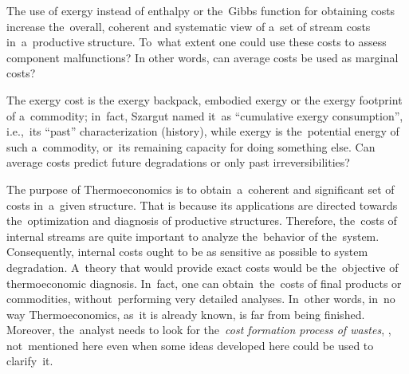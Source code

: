 \documentclass[energies,article,accept,moreauthors,pdftex]{Definitions/mdpi}
\begin{document}
The use of exergy instead of enthalpy or the~Gibbs function for obtaining costs increase the~overall, coherent and systematic view of a~set of stream costs in~a~productive structure. To~what extent one could use these costs to assess component malfunctions? In other words, can average costs be used as marginal costs?

The exergy cost is the exergy backpack, embodied exergy or the exergy footprint of a~commodity; in~fact, Szargut named it~as “cumulative exergy consumption”, \cite{Szargut1988} i.e.,~its “past” characterization (history), while exergy is the~potential energy of such a~commodity, or~its remaining capacity for doing something else. Can average costs predict future degradations or only past irreversibilities?

The purpose of Thermoeconomics is to obtain~a~coherent and significant set of costs in~a~given structure. That is because its applications are directed towards the~optimization and diagnosis of productive structures. Therefore, the~costs of internal streams are quite important to analyze the~behavior of the~system. Consequently, internal costs ought to be as sensitive as possible to system degradation. A~theory that would provide exact costs would be the~objective of thermoeconomic diagnosis. In~fact, one can obtain~the~costs of final products or commodities, without~performing very detailed analyses. In~other words, in~no way Thermoeconomics, as~it is already known, is far from being finished. Moreover, the~analyst needs to look for the~\emph{cost formation process of wastes}, \cite{Torres2008}, not~mentioned here even when some ideas developed here could be used to clarify~it.
\end{document}
